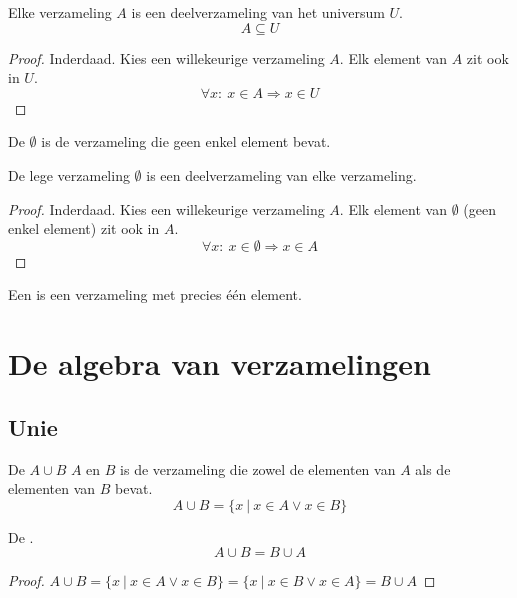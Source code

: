 \documentclass[main.tex]{subfiles}
\begin{document}
\begin{st}
  Elke verzameling $A$ is een deelverzameling van het universum $U$.
  \[ A \subseteq U \]
  \begin{proof}
    Inderdaad. Kies een willekeurige verzameling $A$. 
    Elk element van $A$ zit ook in $U$.
    \[
    \forall x:\ x \in A \Rightarrow x \in U
    \]
  \end{proof}
\end{st}

\begin{de}
  De  $\emptyset$ is de verzameling die geen enkel element bevat.
\end{de}

\begin{st}
  De lege verzameling $\emptyset$ is een deelverzameling van elke verzameling.
  \begin{proof}
    Inderdaad. Kies een willekeurige verzameling $A$.
    Elk element van $\emptyset$ (geen enkel element) zit ook in $A$.
    \[
    \forall x:\ x \in \emptyset \Rightarrow x \in A
    \]
  \end{proof}
\end{st}

\begin{de}
  Een  is een verzameling met precies \'e\'en element.
\end{de}

\section{De algebra van verzamelingen}
\label{sec:de-algebra-van-verzamelingen}
\subsection{Unie}
\label{sec:unie}

\begin{de}
  De  $A \cup B$  $A$ en $B$ is de verzameling die zowel de elementen van $A$ als de elementen van $B$ bevat.
  \[ A \cup B = \{ x\ |\ x \in A \vee x \in B\} \]
\end{de}

\begin{ei}
  De .
  \[ A \cup B = B \cup A \]
  \begin{proof}
    $A \cup B = \{ x\ |\ x \in A \vee x \in B\} = \{ x\ |\ x \in B \vee x \in A\} = B \cup A$
  \end{proof}
\end{ei}
\end{document}
